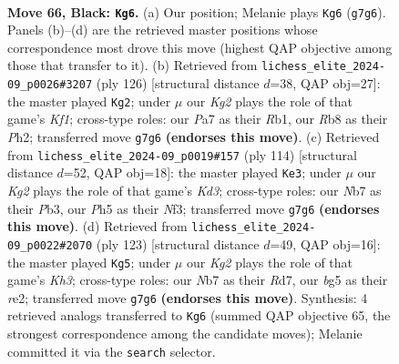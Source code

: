 \documentclass[11pt]{article}
\begin{document}
\clearpage

\begin{figure}[p]\centering
\begin{subfigure}{0.46\textwidth}\centering
\resizebox{\linewidth}{!}{%
\newchessgame
\chessboard[
  setfen={1r6/pn4kr/1p2p3/4P1Bp/2P5/2K3PR/P1N2R2/8 b - - 4 66},
  showmover=false,
  pgfstyle=straightmove, color=movearrow, markmove={g7-g6}
]}
\caption{}
\end{subfigure}\hfill
\begin{subfigure}{0.46\textwidth}\centering
\resizebox{\linewidth}{!}{%
\newchessgame
\chessboard[
  setfen={5r2/6pk/6p1/1P1nr3/4p1B1/4P3/5P1P/1RR2K2 w - - 25 64},
  showmover=false,
  pgfstyle=straightmove, color=movearrow, markmove={f1-g2}
]}
\caption{}
\end{subfigure}
\\[4pt]
\begin{subfigure}{0.46\textwidth}\centering
\resizebox{\linewidth}{!}{%
\newchessgame
\chessboard[
  setfen={2r5/kp6/5p2/p2P1R2/Pb2P3/1P1K1N1r/8/3R4 w - - 28 58},
  showmover=false,
  pgfstyle=straightmove, color=movearrow, markmove={d3-e3}
]}
\caption{}
\end{subfigure}\hfill
\begin{subfigure}{0.46\textwidth}\centering
\resizebox{\linewidth}{!}{%
\newchessgame
\chessboard[
  setfen={8/3r4/p6k/P1p2p1r/2P3p1/2P5/2K1R3/5R2 b - - 1 62},
  showmover=false,
  pgfstyle=straightmove, color=movearrow, markmove={h6-g5}
]}
\caption{}
\end{subfigure}
\caption{\textbf{Move 66, Black: \texttt{Kg6}.} (a) Our position; Melanie plays \texttt{Kg6} (\texttt{g7g6}). Panels (b)--(d) are the retrieved master positions whose correspondence most drove this move (highest QAP objective among those that transfer to it). (b) Retrieved from \texttt{lichess\_elite\_2024-09\_p0026\#3207} (ply 126) [structural distance $d$=38, QAP obj=27]: the master played \texttt{Kg2}; under $\mu$ our \emph{Kg2} plays the role of that game's \emph{Kf1}; cross-type roles: our \emph{P}a7 as their \emph{R}b1, our \emph{R}b8 as their \emph{P}h2; transferred move \texttt{g7g6} \textbf{(endorses this move)}. (c) Retrieved from \texttt{lichess\_elite\_2024-09\_p0019\#157} (ply 114) [structural distance $d$=52, QAP obj=18]: the master played \texttt{Ke3}; under $\mu$ our \emph{Kg2} plays the role of that game's \emph{Kd3}; cross-type roles: our \emph{N}b7 as their \emph{P}b3, our \emph{P}h5 as their \emph{N}f3; transferred move \texttt{g7g6} \textbf{(endorses this move)}. (d) Retrieved from \texttt{lichess\_elite\_2024-09\_p0022\#2070} (ply 123) [structural distance $d$=49, QAP obj=16]: the master played \texttt{Kg5}; under $\mu$ our \emph{Kg2} plays the role of that game's \emph{Kh3}; cross-type roles: our \emph{N}b7 as their \emph{R}d7, our \emph{b}g5 as their \emph{r}e2; transferred move \texttt{g7g6} \textbf{(endorses this move)}. Synthesis: 4 retrieved analogs transferred to \texttt{Kg6} (summed QAP objective 65, the strongest correspondence among the candidate moves); Melanie committed it via the \texttt{search} selector.}
\label{fig:thought-m131}
\end{figure}
\end{document}
